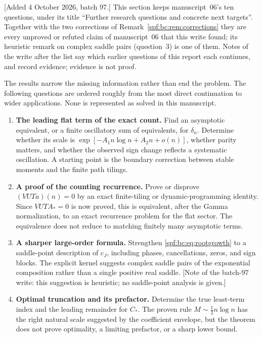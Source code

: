 \documentclass[11pt]{article}
\numberwithin{equation}{section}
\theoremstyle{definition}
\theoremstyle{remark}
\theoremstyle{definition}
\newcommand{\bcC}{C_{\!*}}
\newcommand{\bcA}{A_{\!*}}
\begin{document}
[Added 4 October 2026, batch 97.] This section keeps manuscript~06's ten
questions, under its title ``Further research questions and concrete next
targets''. Together with the two corrections of
Remark~\ref{spf:bc:rem:corrections} they are every unproved or refuted claim
of manuscript~06 that this write found; its heuristic remark on complex saddle
pairs (question~3) is one of them. Notes of the write after the list say
which earlier questions of this report each continues, and record evidence;
evidence is not proof.

The results narrow the missing information rather than end the problem.
The following questions are ordered roughly from the most direct continuation
to wider applications. None is represented as solved in this manuscript.

\begin{enumerate}[label=\textbf{Q\arabic*.},leftmargin=*]
\item \textbf{The leading flat term of the exact count.}
Find an asymptotic equivalent, or a finite oscillatory sum of equivalents,
for $\delta_n$. Determine whether its scale is
$\exp[-A_1n\log n+A_2n+o(n)]$, whether parity matters, and whether the
observed sign change reflects a systematic oscillation. A starting point is
the boundary correction between stable moments and the finite path tilings.

\item \textbf{A proof of the counting recurrence.}
Prove or disprove $(VUTa)(n)=0$ by an exact finite-tiling or dynamic-programming
identity. Since $VUT\bcA=0$ is now proved, this is equivalent, after the
Gamma normalization, to an exact recurrence problem for the flat sector.
The equivalence does not reduce to matching finitely many asymptotic terms.

\item \textbf{A sharper large-order formula.}
Strengthen \eqref{spf:bc:eq:rootgrowth} to a saddle-point description of $c_J$,
including phases, cancellations, zeros, and sign blocks. The explicit kernel
suggests complex saddle pairs of the exponential composition rather than a
single positive real saddle. [Note of the batch-97 write: this
suggestion is heuristic; no saddle-point analysis is given.]

\item \textbf{Optimal truncation and its prefactor.}
Determine the true least-term index and the leading remainder for $\bcC$.
The proven rule $M\sim\tfrac12n\log n$ has the right natural scale suggested
by the coefficient envelope, but the theorem does not prove optimality,
a limiting prefactor, or a sharp lower bound.


\end{enumerate}
\end{document}
